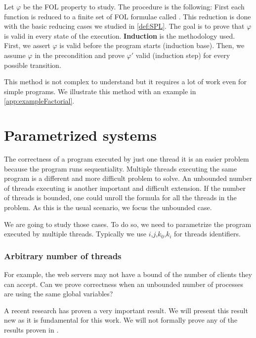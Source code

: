 Let $\varphi$ be the \gls{FOL} property to study. 
%
The procedure is the following:
%
First each function is reduced to a finite set of \gls{FOL} formulae called .
%
This reduction is done with the basic reducing cases we studied in \ref{def:SPL}.
%
The goal is to prove that $\varphi$ is valid in every state of the execution.
%
\textbf{Induction} is the methodology used.
%
First, we assert $\varphi$ is valid before the program starts (induction base).
%
Then, we assume $\varphi$ in the precondition and prove $\varphi'$ valid (induction step) for every possible transition.

This method is not complex to understand but it requires a lot of work even for simple programs. 
%
We illustrate this method with an example in \ref{app:exampleFactorial}.

\vspace{-0.3cm}
\section{Parametrized systems}

The correctness of a program executed by just one thread it is an easier problem because the program runs sequentiality.
%
Multiple threads executing the same program is a different and more difficult problem to solve.
%
An unbounded number of threads executing is another important and difficult extension.
%
If the number of threads is bounded, one could unroll the formula for all the threads in the problem. 
%
As this is the usual scenario, we focus the unbounded case.

We are going to study those cases. 
%
To do so, we need to parametrize the program executed by multiple threads.
%
Typically we use  $i$,$j$,$k_0$,$k_i$ for threads identifiers.

\vspace{-0.3cm}
\subsubsection{Arbitrary number of threads}

For example, the web servers may not have a bound of the number of clients they can accept.
%
Can we prove correctness when an unbounded number of processes are using the same global variables?

A recent research  has proven a very important result. 
%
We will present this result new as it is fundamental for this work. 
%
We will not formally prove any of the results proven in \citep{paperParametrizedInvariants}.

